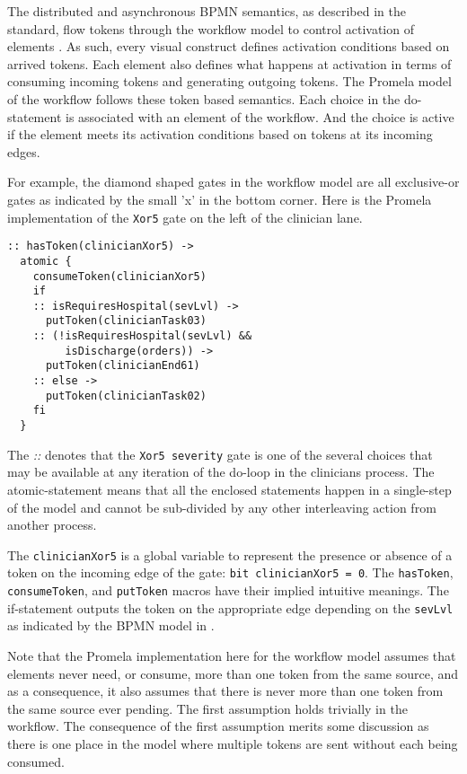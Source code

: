 The distributed and asynchronous BPMN semantics, as described in the standard, flow tokens through the workflow model to control activation of elements \cite{BPMNSpecification}. As such, every visual construct defines activation conditions based on arrived tokens. Each element also defines what happens at activation in terms of consuming incoming tokens and generating outgoing tokens. The Promela model of the workflow follows these token based semantics. Each choice in the do-statement is associated with an element of the workflow. And the choice is active if the element meets its activation conditions based on tokens at its incoming edges.

For example, the diamond shaped gates in the workflow model are all exclusive-or gates as indicated by the small 'x' in the bottom corner. Here is the Promela implementation of the \texttt{Xor5} gate on the left of the clinician lane.
%
{\small
\begin{lstlisting}[style=myPromela]
:: hasToken(clinicianXor5) ->
  atomic {
    consumeToken(clinicianXor5)
    if
    :: isRequiresHospital(sevLvl) ->
      putToken(clinicianTask03)
    :: (!isRequiresHospital(sevLvl) && 
         isDischarge(orders)) ->
      putToken(clinicianEnd61)
    :: else ->
      putToken(clinicianTask02)
    fi
  }
\end{lstlisting}
}
% 
\noindent The \emph{::} denotes that the \texttt{Xor5 severity} gate is one of the several choices that may be available at any iteration of the do-loop in the clinicians process. The atomic-statement means that all the enclosed statements happen in a single-step of the model and cannot be sub-divided by any other interleaving action from another process.

The \texttt{clinicianXor5} is a global variable to represent the presence or absence of a token on the incoming edge of the gate: \texttt{bit clinicianXor5 = 0}. The \texttt{hasToken}, \texttt{consumeToken}, and \texttt{putToken} macros have their implied intuitive meanings. The if-statement outputs the token on the appropriate edge depending on the \texttt{sevLvl} as indicated by the BPMN model in . 

Note that the Promela implementation here for the workflow model assumes that elements never need, or consume, more than one token from the same source, and as a consequence, it also assumes that there is never more than one token from the same source ever pending. The first assumption holds trivially in the workflow. The consequence of the first assumption merits some discussion as there is one place in the model where multiple tokens are sent without each being consumed.

